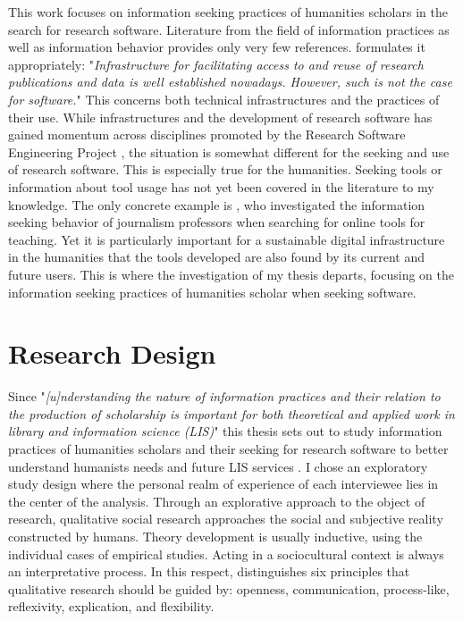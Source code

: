 \documentclass[12pt, a4paper, titlepage, oneside, abstract=true, toc=listof, toc=bibliography, BCOR=1cm]{scrreprt}
\begin{document}
This work focuses on information seeking practices of humanities scholars in the search for research software. Literature from the field of information practices as well as information behavior provides only very few references. \citet[p. 231]{Buddenbohm2017} formulates it appropriately: "\textit{Infrastructure for facilitating access to and reuse of research publications and data is well established nowadays. However, such is not the case for software.}" This concerns both technical infrastructures and the practices of their use. While infrastructures and the development of research software has gained momentum across disciplines promoted by the Research Software Engineering Project \citep{Baxter2012}, the situation is somewhat different for the seeking and use of research software. This is especially true for the humanities. Seeking tools or information about tool usage has not yet been covered in the literature to my knowledge. The only concrete example is \citet{Hepworth2017}, who investigated the information seeking behavior of journalism professors when searching for online tools for teaching. Yet it is particularly important for a sustainable digital infrastructure in the humanities \citep{Neuefeind2020} that the tools developed are also found by its current and future users. This is where the investigation of my thesis departs, focusing on the information seeking practices of humanities scholar when seeking software.
	
\chapter{Research Design}
\label{sec:RD}
Since "\textit{[u]nderstanding the nature of information practices and their relation to the production of scholarship is important for both theoretical and applied work in library and information science (LIS)}" \citep[p. 165]{Palmer2009} this thesis sets out to study information practices of humanities scholars and their seeking for research software to better understand humanists needs and future LIS services \citep{Case2008, Cunningham2010}. I chose an exploratory study design \citep{Rinsdorf2013} where the personal realm of experience of each interviewee lies in the center of the analysis. Through an explorative approach to the object of research, qualitative social research approaches the social and subjective reality constructed by humans. Theory development is usually inductive, using the individual cases of empirical studies. Acting in a sociocultural context is always an interpretative process. In this respect, \citet[p. 20ff]{Lamnek2005} distinguishes six principles that qualitative research should be guided by: openness, communication, process-like, reflexivity, explication, and flexibility.
\end{document}
